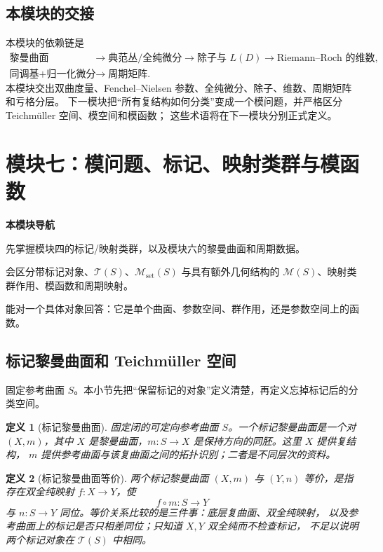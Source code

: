 \documentclass[UTF8,fontset=none,a4paper,11pt]{ctexart}
\theoremstyle{foundation-definition}
\newtheorem{definition}{定义}[section]
\theoremstyle{foundation-theorem}
\theoremstyle{foundation-proposition}
\theoremstyle{foundation-example}
\theoremstyle{foundation-remark}
\theoremstyle{foundation-theorem}
\newcommand{\T}{\mathcal T}
\newcommand{\M}{\mathcal M}
\newcommand{\moduleguide}[3]{%
\begin{mdframed}[backgroundcolor=definitionbg,linecolor=mainblue,linewidth=1.5pt,
  leftline=true,rightline=false,topline=false,bottomline=false,
  skipabove=9pt,skipbelow=10pt,innerleftmargin=10pt,innerrightmargin=8pt,
  innertopmargin=7pt,innerbottommargin=7pt]
{\sffamily\bfseries\color{mainblue}本模块导航}\par\smallskip
\begin{description}[style=nextline,leftmargin=2.8cm]
  \item[进入前] #1
  \item[本模块产出] #2
  \item[出口检查] #3
\end{description}
\end{mdframed}}
\begin{document}
\subsection{本模块的交接}

本模块的依赖链是
\[
\begin{aligned}
\text{黎曼曲面}
&\longrightarrow
\text{典范丛/全纯微分}
\longrightarrow
\text{除子与 }L(D)
\longrightarrow
\text{Riemann--Roch 的维数},\\
\text{同调基}+\text{归一化微分}
&\longrightarrow
\text{周期矩阵}.
\end{aligned}
\]
本模块交出双曲度量、Fenchel--Nielsen 参数、全纯微分、除子、维数、周期矩阵和亏格分层。
下一模块把“所有复结构如何分类”变成一个模问题，并严格区分 Teichmüller 空间、模空间和模函数；
这些术语将在下一模块分别正式定义。

\clearpage
\section{模块七：模问题、标记、映射类群与模函数}

\moduleguide{先掌握模块四的标记/映射类群，以及模块六的黎曼曲面和周期数据。}{会区分带标记对象、\(\T(S)\)、\(\M_{\mathrm{set}}(S)\) 与具有额外几何结构的 \(\M(S)\)、映射类群作用、模函数和周期映射。}{能对一个具体对象回答：它是单个曲面、参数空间、群作用，还是参数空间上的函数。}

\subsection{标记黎曼曲面和 Teichmüller 空间}

固定参考曲面 \(S\)。本小节先把“保留标记的对象”定义清楚，再定义忘掉标记后的分类空间。

\begin{definition}[标记黎曼曲面]\label{def:marked-riemann}
固定闭的可定向参考曲面 \(S\)。一个标记黎曼曲面是一个对 \((X,m)\)，其中
\(X\) 是黎曼曲面，\(m:S\to X\) 是保持方向的同胚。这里 \(X\) 提供复结构，
\(m\) 提供参考曲面与该复曲面之间的拓扑识别；二者是不同层次的资料。
\end{definition}

\begin{definition}[标记黎曼曲面等价]\label{def:marked-riemann-equivalence}
两个标记黎曼曲面 \((X,m)\) 与 \((Y,n)\) 等价，是指存在双全纯映射
\(f:X\to Y\)，使
\[
f\circ m:S\longrightarrow Y
\]
与 \(n:S\to Y\) 同位。等价关系比较的是三件事：底层复曲面、双全纯映射，
以及参考曲面上的标记是否只相差同位；只知道 \(X,Y\) 双全纯而不检查标记，
不足以说明两个标记对象在 \(\T(S)\) 中相同。
\end{definition}
\end{document}

